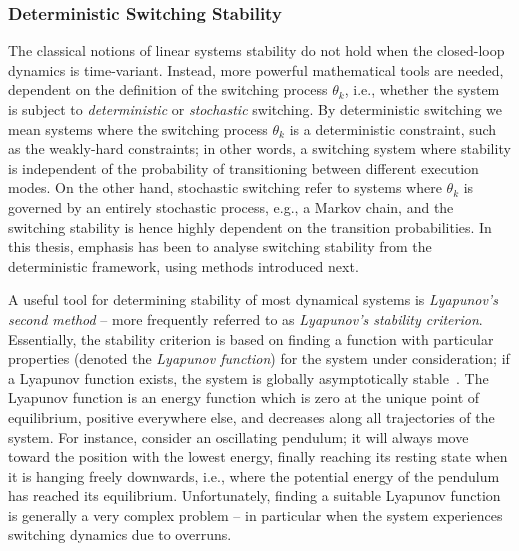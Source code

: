 \subsubsection*{Deterministic Switching Stability}%
%
The classical notions of linear systems stability do not hold when the closed-loop dynamics is time-variant.
Instead, more powerful mathematical tools are needed, dependent on the definition of the switching process $\theta_k$, i.e., whether the system is subject to \emph{deterministic} or \emph{stochastic} switching.
By deterministic switching we mean systems where the switching process $\theta_k$ is a deterministic constraint, such as the weakly-hard constraints; in other words, a switching system where stability is independent of the probability of transitioning between different execution modes.
On the other hand, stochastic switching refer to systems where $\theta_k$ is governed by an entirely stochastic process, e.g., a Markov chain, and the switching stability is hence highly dependent on the transition probabilities.
In this thesis, emphasis has been to analyse switching stability from the deterministic framework, using methods introduced next.

A useful tool for determining stability of most dynamical systems is \emph{Lyapunov's second method} -- more frequently referred to as \emph{Lyapunov's stability criterion}.
Essentially, the stability criterion is based on finding a function with particular properties (denoted the \emph{Lyapunov function}) for the system under consideration; if a Lyapunov function exists, the system is globally asymptotically stable~\cite{Astrom:1997}.
The Lyapunov function is an energy function which is zero at the unique point of equilibrium, positive everywhere else, and decreases along all trajectories of the system.
For instance, consider an oscillating pendulum; it will always move toward the position with the lowest energy, finally reaching its resting state when it is hanging freely downwards, i.e., where the potential energy of the pendulum has reached its equilibrium.
Unfortunately, finding a suitable Lyapunov function is generally a very complex problem -- in particular when the system experiences switching dynamics due to overruns.

